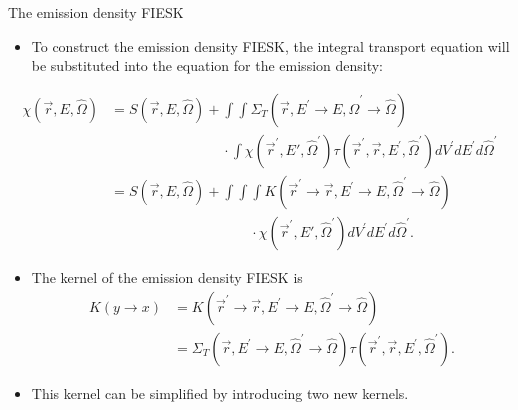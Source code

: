 \documentclass{beamer}
\begin{document}
\begin{frame}{The emission density FIESK}

  \begin{itemize}
    \item To construct the emission density FIESK, the integral transport 
      equation will be substituted into the equation for the emission density:
  \end{itemize}
  \begin{align}
    \chi(\vec{r},E,\hat{\Omega}) & = S(\vec{r},E,\hat{\Omega}) +
    \int\int \Sigma_T(\vec{r},E^{'} \to E, \hat{\Omega}^{'} \to \hat{\Omega})
    \nonumber \\
    & \qquad \qquad \qquad \qquad \cdot
    \int \chi(\vec{r}^{'},E',\hat{\Omega}^{'})
    \tau(\vec{r}^{'},\vec{r},E^{'},\hat{\Omega}^{'})
    dV^{'}dE^{'}d\hat{\Omega}^{'} \nonumber \\
    & = S(\vec{r},E,\hat{\Omega}) + \int\int\int
    K(\vec{r}^{'} \to \vec{r}, E^{'} \to E, \hat{\Omega}^{'} \to \hat{\Omega})
    \nonumber \\
    & \qquad \qquad \qquad \qquad \qquad \cdot
    \chi(\vec{r}^{'},E',\hat{\Omega}^{'}) dV^{'}dE^{'}d\hat{\Omega}^{'}.
    \nonumber
  \end{align}

  \begin{itemize}
    \item The kernel of the emission density FIESK is
      \begin{align}
        K(y \to x) & = K(\vec{r}^{'} \to \vec{r}, E^{'} \to E, 
        \hat{\Omega}^{'} \to \hat{\Omega}) \nonumber \\
        & = \Sigma_T(\vec{r},E^{'} \to E, \hat{\Omega}^{'} \to \hat{\Omega})
        \tau(\vec{r}^{'},\vec{r},E^{'},\hat{\Omega}^{'}). \nonumber
      \end{align}
    \item This kernel can be simplified by introducing two new kernels.
  \end{itemize}

\end{frame}
\end{document}
